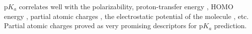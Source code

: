 p$K_a$ correlates well with the polarizability\cite{Jelfs2007}, 
proton-transfer energy \cite{Gross2001}, HOMO energy \cite{Gross2001},
partial atomic charges \cite{Citra1999, Gross2002, Kreye2009, Svobodova2011, Svobodova2013},
the electrostatic potential of the molecule \cite{Liu2009}, etc.
Partial atomic charges proved as very promising
descriptors \cite{Citra1999, Gross2002, Kreye2009, Svobodova2011, Svobodova2013} for p$K_a$
prediction.


